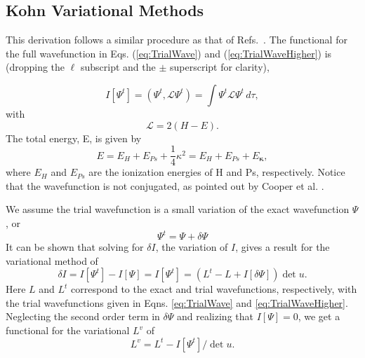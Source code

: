 \documentclass[preprint,showpacs,showkeys,preprintnumbers,amsmath,amssymb,longbibliography,pra,aps]{revtex4-1}
\begin{document}
\subsection{Kohn Variational Methods}
\label{sec:Kohn}
This derivation follows a similar procedure as that of
Refs.~\cite{Lucchese1989,Cooper2010,Armour1991,VanReethThesis}.
The functional for the full wavefunction in Eqs. (\ref{eq:TrialWave}) and
(\ref{eq:TrialWaveHigher}) is (dropping the $\ell$ subscript and the $\pm$ 
superscript for clarity),

\begin{equation}
I[\Psi^t] = \left(\Psi^t, \mathcal{L} \Psi^t \right) = \int \Psi^t \mathcal{L}
  \Psi^t \,d\tau,
\label{eq:IlDefPsi}
\end{equation}
with
\begin{equation}
\mathcal{L} = 2(H - E).
\label{eq:LDef}
\end{equation}
The total energy, E, is given by
\begin{equation}
\label{eq:TotalEnergy}
E = E_H + E_{Ps} + \frac{1}{4}\kappa^2 = E_H + E_{Ps} + E_{\bm \kappa},
\end{equation}
where $E_H$ and $E_{Ps}$ are the ionization energies of H and Ps, respectively.
Notice that the wavefunction is not conjugated, as pointed out by Cooper et al.
\cite{Cooper2010}.

We assume the trial wavefunction is a small variation of the exact wavefunction
$\Psi$, or
\begin{equation}
\Psi^t = \Psi + \delta \Psi
\label{eq:PsiTrialRelation}
\end{equation}
It can be shown that solving for $\delta I$, the variation of $I$, gives a
result for the variational method of
\begin{equation}
\delta I = I[\Psi^t] - I[\Psi] = I[\Psi^t] = (L^t - L + I[\delta \Psi]) \det u.
\label{eq:IlPsiVariation}
\end{equation}
Here $L$ and $L^t$ correspond to the exact and trial wavefunctions,
respectively, with the trial wavefunctions given in Eqns. \ref{eq:TrialWave}
and \ref{eq:TrialWaveHigher}. Neglecting the second order term in
$\delta \Psi$ and realizing that $I[\Psi] = 0$, we get a functional for the
variational $L^v$ of
\begin{equation}
L^v = L^t - I[\Psi^t] / \det u.
\label{eq:ComplexKohnVariation}
\end{equation}
\end{document}
